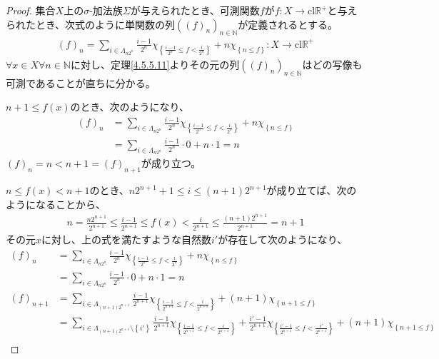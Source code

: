 \documentclass[dvipdfmx]{jsarticle}
\begin{document}
\begin{proof}
集合$X$上の$\sigma$-加法族$\varSigma$が与えられたとき、可測関数$f$が$f:X \rightarrow \mathrm{cl}\mathbb{R}^{+}$と与えられたとき、次式のように単関数の列$\left( (f)_{n} \right)_{n \in \mathbb{N}}$が定義されるとする。
\begin{align*}
(f)_{n} = \sum_{i \in \varLambda_{n2^{n}}} {\frac{i - 1}{2^{n}}\chi_{\left\{ \frac{i - 1}{2^{n}} \leq f < \frac{i}{2^{n}} \right\}}} + n\chi_{\left\{ n \leq f \right\}}:X \rightarrow \mathrm{cl}\mathbb{R}^{+}
\end{align*}
$\forall x \in X\forall n \in \mathbb{N}$に対し、定理\ref{4.5.5.11}よりその元の列$\left( (f)_{n} \right)_{n \in \mathbb{N}}$はどの写像も可測であることが直ちに分かる。\par
$n + 1 \leq f(x)$のとき、次のようになり、
\begin{align*}
(f)_{n} &= \sum_{i \in \varLambda_{n2^{n}}} {\frac{i - 1}{2^{n}}\chi_{\left\{ \frac{i - 1}{2^{n}} \leq f < \frac{i}{2^{n}} \right\}}} + n\chi_{\left\{ n \leq f \right\}}\\
&= \sum_{i \in \varLambda_{n2^{n}}} {\frac{i - 1}{2^{n}} \cdot 0} + n \cdot 1 = n
\end{align*}
$(f)_{n} = n < n + 1 = (f)_{n + 1}$が成り立つ。\par
$n \leq f(x) < n + 1$のとき、$n2^{n + 1} + 1 \leq i \leq (n + 1)2^{n + 1}$が成り立てば、次のようになることから、
\begin{align*}
n = \frac{n2^{n + 1}}{2^{n + 1}} \leq \frac{i - 1}{2^{n + 1}} \leq f(x) < \frac{i}{2^{n + 1}} \leq \frac{(n + 1)2^{n + 1}}{2^{n + 1}} = n + 1
\end{align*}
その元$x$に対し、上の式を満たすような自然数$i'$が存在して次のようになり、
\begin{align*}
(f)_{n} &= \sum_{i \in \varLambda_{n2^{n}}} {\frac{i - 1}{2^{n}}\chi_{\left\{ \frac{i - 1}{2^{n}} \leq f < \frac{i}{2^{n}} \right\}}} + n\chi_{\left\{ n \leq f \right\}}\\
&= \sum_{i \in \varLambda_{n2^{n}}} {\frac{i - 1}{2^{n}} \cdot 0} + n \cdot 1 = n\\
(f)_{n + 1} &= \sum_{i \in \varLambda_{(n + 1)2^{n + 1}}} {\frac{i - 1}{2^{n + 1}}\chi_{\left\{ \frac{i - 1}{2^{n + 1}} \leq f < \frac{i}{2^{n + 1}} \right\}}} + (n + 1)\chi_{\left\{ n + 1 \leq f \right\}}\\
&= \sum_{i \in \varLambda_{(n + 1)2^{n + 1}} \setminus \left\{ i' \right\}} {\frac{i - 1}{2^{n + 1}}\chi_{\left\{ \frac{i - 1}{2^{n + 1}} \leq f < \frac{i}{2^{n + 1}} \right\}}} + \frac{i' - 1}{2^{n + 1}}\chi_{\left\{ \frac{i' - 1}{2^{n + 1}} \leq f < \frac{i'}{2^{n + 1}} \right\}} + (n + 1)\chi_{\left\{ n + 1 \leq f \right\}}\\

\end{align*}
\end{proof}
\end{document}
